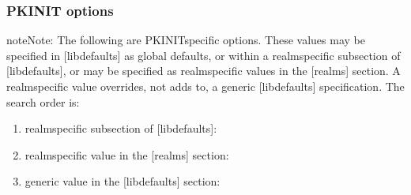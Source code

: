 \documentclass[letterpaper,10pt,english]{sphinxmanual}
\begin{document}
\subsubsection{PKINIT options}
\label{\detokenize{admin/conf_files/krb5_conf:pkinit-options}}
\begin{sphinxadmonition}{note}{Note:}
\sphinxAtStartPar
The following are PKINIT\sphinxhyphen{}specific options.  These values may
be specified in {[}libdefaults{]} as global defaults, or within
a realm\sphinxhyphen{}specific subsection of {[}libdefaults{]}, or may be
specified as realm\sphinxhyphen{}specific values in the {[}realms{]} section.
A realm\sphinxhyphen{}specific value overrides, not adds to, a generic
{[}libdefaults{]} specification.  The search order is:
\end{sphinxadmonition}
\begin{enumerate}
%
\item {} 
\sphinxAtStartPar
realm\sphinxhyphen{}specific subsection of {[}libdefaults{]}:

\begin{sphinxVerbatim}[commandchars=\\\{\}]
\PYG{p}{[}\PYG{p}{]}
      
          
\end{sphinxVerbatim}

\item {} 
\sphinxAtStartPar
realm\sphinxhyphen{}specific value in the {[}realms{]} section:

\begin{sphinxVerbatim}[commandchars=\\\{\}]
\PYG{p}{[}\PYG{p}{]}
      
          
\end{sphinxVerbatim}

\item {} 
\sphinxAtStartPar
generic value in the {[}libdefaults{]} section:

\begin{sphinxVerbatim}[commandchars=\\\{\}]
\PYG{p}{[}\PYG{p}{]}
      
\end{sphinxVerbatim}

\end{enumerate}
\end{document}
